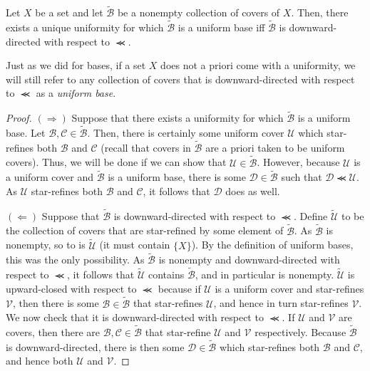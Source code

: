 \begin{prp}\label{prp4.3.2}
Let $X$ be a set and let $\widetilde{\mathcal{B}}$ be a nonempty collection of covers of $X$.  Then, there exists a unique uniformity for which $\widetilde{\mathcal{B}}$ is a uniform base iff $\widetilde{\mathcal{B}}$ is downward-directed with respect to $\llcurly$.
\begin{rmk}
Just as we did for bases, if a set $X$ does not a priori come with a uniformity, we will still refer to any collection of covers that is downward-directed with respect to $\llcurly$ as a \emph{uniform base}.
\end{rmk}
\begin{proof}
$(\Rightarrow )$ Suppose that there exists a uniformity for which $\widetilde{\mathcal{B}}$ is a uniform base.  Let $\mathcal{B},\mathcal{C}\in \widetilde{\mathcal{B}}$.  Then, there is certainly some uniform cover $\mathcal{U}$ which star-refines both $\mathcal{B}$ and $\mathcal{C}$ (recall that covers in $\widetilde{\mathcal{B}}$ are a priori taken to be uniform covers).  Thus, we will be done if we can show that $\mathcal{U}\in \widetilde{\mathcal{B}}$.  However, because $\mathcal{U}$ is a uniform cover and $\widetilde{\mathcal{B}}$ is a uniform base, there is some $\mathcal{D}\in \widetilde{\mathcal{B}}$ such that $\mathcal{D}\llcurly \mathcal{U}$.  As $\mathcal{U}$ star-refines both $\mathcal{B}$ and $\mathcal{C}$, it follows that $\mathcal{D}$ does as well.

\blankline
\noindent
$(\Leftarrow )$ Suppose that $\widetilde{\mathcal{B}}$ is downward-directed with respect to $\llcurly$.  Define $\widetilde{\mathcal{U}}$ to be the collection of covers that are star-refined by some element of $\widetilde{\mathcal{B}}$.  As $\widetilde{\mathcal{B}}$ is nonempty, so to is $\widetilde{\mathcal{U}}$ (it must contain $\{ X\}$).  By the definition of uniform bases, this was the only possibility.  As $\widetilde{\mathcal{B}}$ is nonempty and downward-directed with respect to $\llcurly$, it follows that $\widetilde{\mathcal{U}}$ contains $\widetilde{\mathcal{B}}$, and in particular is nonempty.  $\widetilde{\mathcal{U}}$ is upward-closed with respect to $\llcurly$ because if $\mathcal{U}$ is a uniform cover and star-refines $\mathcal{V}$, then there is some $\mathcal{B}\in \widetilde{\mathcal{B}}$ that star-refines $\mathcal{U}$, and hence in turn star-refines $\mathcal{V}$.  We now check that it is downward-directed with respect to $\llcurly$.  If $\mathcal{U}$ and $\mathcal{V}$ are covers, then there are $\mathcal{B},\mathcal{C}\in \widetilde{\mathcal{B}}$ that star-refine $\mathcal{U}$ and $\mathcal{V}$ respectively.  Because $\widetilde{\mathcal{B}}$ is downward-directed, there is then some $\mathcal{D}\in \widetilde{\mathcal{B}}$ which star-refines both $\mathcal{B}$ and $\mathcal{C}$, and hence both $\mathcal{U}$ and $\mathcal{V}$.
\end{proof}
\end{prp}

